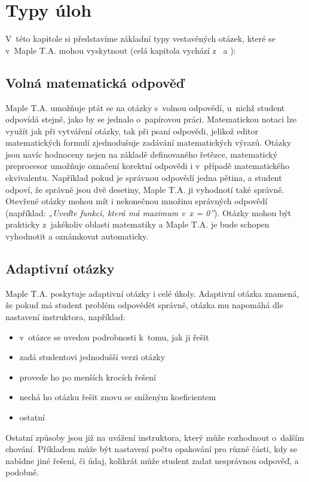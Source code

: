 \documentclass[
print,
  11pt,
  table,   
  nolof,    
  nolot,
  oneside,final
]{fithesis3}
\begin{document}
	\section{Typy úloh} \label{sec:typyuloh}

V~této kapitole si představíme základní typy vestavěných otázek, které se v~Maple T.A. mohou vyskytnout (celá kapitola vychází z~\cite{maple-question} a \cite{char}):

	\subsection{Volná matematická odpověď}
Maple T.A. umožňuje ptát se na otázky s~volnou odpovědí, u~nichž student odpovídá stejně, jako by se jednalo o~papírovou práci. Matematickou notaci lze využít jak při vytváření otázky, tak při psaní odpovědi, jelikož editor matematických formulí zjednodušuje zadávání matematických výrazů. Otázky jsou navíc hodnoceny nejen na základě definovaného řetězce, matematický preprocesor umožňuje označení korektní odpovědi i v~případě matematického ekvivalentu. Například pokud je správnou odpovědí jedna pětina, a student odpoví, že správně jsou dvě desetiny, Maple T.A. ji vyhodnotí také správně. Otevřené otázky mohou mít i nekonečnou množinu správných odpovědí (například: \emph{„Uveďte funkci, která má maximum v~x = 0”}). Otázky mohou být prakticky z~jakékoliv oblasti matematiky a Maple T.A. je bude schopen vyhodnotit a oznámkovat automaticky.


	\subsection{Adaptivní otázky}
Maple T.A. poskytuje adaptivní otázky i celé úkoly. Adaptivní otázka znamená, že pokud má student problém odpovědět správně, otázka mu napomáhá dle nastavení instruktora, například:
\begin{itemize}
	\item v~otázce se uvedou podrobnosti k~tomu, jak ji řešit
	\item zadá studentovi jednodušší verzi otázky
	\item provede ho po menších krocích řešení
	\item nechá ho otázku řešit znovu se sníženým koeficientem
	\item ostatní
\end{itemize}

Ostatní způsoby jsou již na uvážení instruktora, který může rozhodnout o~dalším chování. Příkladem může být nastavení počtu opakování pro různé části, kdy se nabídne jiné řešení, či údaj, kolikrát může student zadat nesprávnou odpověď, a podobně.
\end{document}
